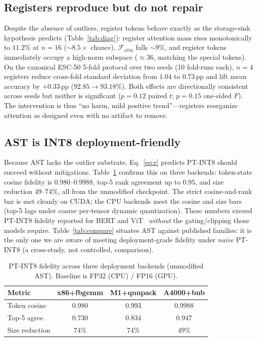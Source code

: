 \documentclass{Interspeech2024}
\begin{document}
\subsection{Registers reproduce but do not repair}
Despite the absence of outliers, register tokens behave exactly as the storage-sink hypothesis predicts (Table~\ref{tab:diag}): register attention mass rises monotonically to $11.2\%$ at $n{=}16$ ($\sim\!8.5\times$ chance), $\mathcal{F}_{\text{attn}}$ falls $\sim\!9\%$, and register tokens immediately occupy a high-norm subspace ($\approx 36$, matching the special tokens). On the canonical ESC-50 5-fold protocol over two seeds (10 fold-runs each), $n{=}4$ registers reduce cross-fold standard deviation from $1.04$ to $0.73$\,pp and lift mean accuracy by $+0.33$\,pp ($92.85\!\to\!93.18\%$). Both effects are directionally consistent across seeds but neither is significant ($p{=}0.12$ paired $t$; $p{=}0.15$ one-sided $F$). The intervention is thus ``no harm, mild positive trend''---registers reorganize attention as designed even with no artifact to remove.

\subsection{AST is INT8 deployment-friendly}
Because AST lacks the outlier substrate, Eq.~\eqref{eq:r} predicts PT-INT8 should succeed without mitigations. Table~\ref{tab:int8} confirms this on three backends: token-state cosine fidelity is $0.980$--$0.9988$, top-5 rank agreement up to $0.95$, and size reduction $49$--$74\%$, all from the unmodified checkpoint. The strict cosine-and-rank bar is met cleanly on CUDA; the CPU backends meet the cosine and size bars (top-5 lags under coarse per-tensor dynamic quantization). These numbers exceed PT-INT8 fidelity reported for BERT and ViT~\cite{bondarenko2023quantizable} \emph{without} the gating/clipping those models require. Table~\ref{tab:compare} situates AST against published families: it is the only one we are aware of meeting deployment-grade fidelity under \emph{naive} PT-INT8 (a cross-study, not controlled, comparison).

\begin{table}[t]
\caption{PT-INT8 fidelity across three deployment backends (unmodified AST). Baseline is FP32 (CPU) / FP16 (GPU).}
\label{tab:int8}
\centering\renewcommand{\arraystretch}{1.1}\setlength{\tabcolsep}{4pt}
\begin{tabular}{lccc}
\toprule
Metric & x86+fbgemm & M1+qnnpack & A4000+bnb\\
\midrule
Token cosine & $0.980$ & $0.993$ & $\mathbf{0.9988}$\\
Top-5 agree. & $0.730$ & $0.834$ & $\mathbf{0.947}$\\
Size reduction & $74\%$ & $74\%$ & $49\%$\\
\bottomrule
\end{tabular}
\end{table}
\end{document}
